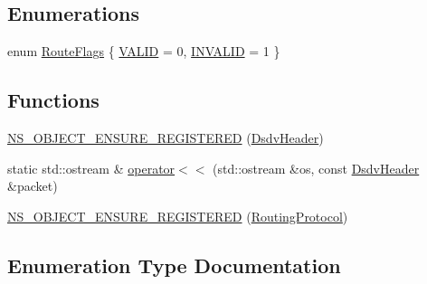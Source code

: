 \subsection*{Enumerations}
\begin{DoxyCompactItemize}
\item 
enum \hyperlink{namespacens3_1_1dsdv_aa1c39555b993cc6f56f2c8c6c31e2c3b}{Route\+Flags} \{ \hyperlink{namespacens3_1_1dsdv_aa1c39555b993cc6f56f2c8c6c31e2c3baf2cbf3d202d1c7338230c662e6822e65}{V\+A\+L\+ID} = 0, 
\hyperlink{namespacens3_1_1dsdv_aa1c39555b993cc6f56f2c8c6c31e2c3ba2dbd3930b34b55bfe8d1a3617eabb9de}{I\+N\+V\+A\+L\+ID} = 1
 \}
\end{DoxyCompactItemize}
\subsection*{Functions}
\begin{DoxyCompactItemize}
\item 
\hyperlink{namespacens3_1_1dsdv_afb44568c810ccf87d2f28891081c6893}{N\+S\+\_\+\+O\+B\+J\+E\+C\+T\+\_\+\+E\+N\+S\+U\+R\+E\+\_\+\+R\+E\+G\+I\+S\+T\+E\+R\+ED} (\hyperlink{classns3_1_1dsdv_1_1DsdvHeader}{Dsdv\+Header})
\item 
static std\+::ostream \& \hyperlink{namespacens3_1_1dsdv_a24401288747c111b6394d728b020efe7}{operator$<$$<$} (std\+::ostream \&os, const \hyperlink{classns3_1_1dsdv_1_1DsdvHeader}{Dsdv\+Header} \&packet)
\item 
\hyperlink{namespacens3_1_1dsdv_af3d57a6a6a855a705053538a68c9f2c7}{N\+S\+\_\+\+O\+B\+J\+E\+C\+T\+\_\+\+E\+N\+S\+U\+R\+E\+\_\+\+R\+E\+G\+I\+S\+T\+E\+R\+ED} (\hyperlink{classns3_1_1dsdv_1_1RoutingProtocol}{Routing\+Protocol})
\end{DoxyCompactItemize}


\subsection{Enumeration Type Documentation}
